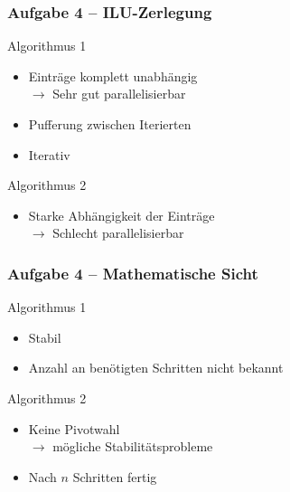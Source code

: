 \documentclass[german,notes,18pt]{beamer}
\begin{document}
	\begin{frame}
		\frametitle{Aufgabe 4 -- ILU-Zerlegung}
		
		Algorithmus 1
		\begin{itemize}
			\item Einträge komplett unabhängig \\
			$\rightarrow$ Sehr gut parallelisierbar
			\item Pufferung zwischen Iterierten
			\item Iterativ
		\end{itemize}

		\vspace{2em}

		Algorithmus 2
		\begin{itemize}
			\item Starke Abhängigkeit der Einträge \\
			$\rightarrow$ Schlecht parallelisierbar
		\end{itemize}
	\end{frame}


	\begin{frame}
		\frametitle{Aufgabe 4 -- Mathematische Sicht}
		
		Algorithmus 1
		\begin{itemize}
			\item Stabil \\
			\item Anzahl an benötigten Schritten nicht bekannt
		\end{itemize}

		\vspace{2em}		

		Algorithmus 2
		\begin{itemize}
			\item Keine Pivotwahl \\
			$\rightarrow$ mögliche Stabilitätsprobleme \\
			\item Nach $n$ Schritten fertig
		\end{itemize}
		
	\end{frame}
\end{document}
